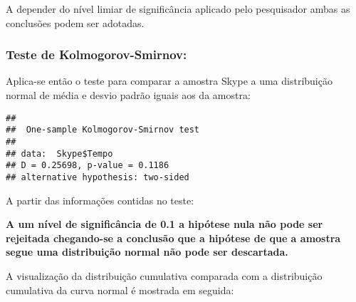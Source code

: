 \documentclass[
]{article}
\newenvironment{Shaded}{\begin{snugshade}}{\end{snugshade}}
\newcommand{\DataTypeTok}[1]{\textcolor[rgb]{0.13,0.29,0.53}{#1}}
\newcommand{\DecValTok}[1]{\textcolor[rgb]{0.00,0.00,0.81}{#1}}
\newcommand{\KeywordTok}[1]{\textcolor[rgb]{0.13,0.29,0.53}{\textbf{#1}}}
\newcommand{\NormalTok}[1]{#1}
\newcommand{\OperatorTok}[1]{\textcolor[rgb]{0.81,0.36,0.00}{\textbf{#1}}}
\newcommand{\StringTok}[1]{\textcolor[rgb]{0.31,0.60,0.02}{#1}}
\begin{document}
A depender do nível limiar de significância aplicado pelo pesquisador
ambas as conclusões podem ser adotadas.

\hypertarget{teste-de-kolmogorov-smirnov-2}{%
\subsubsection{Teste de
Kolmogorov-Smirnov:}\label{teste-de-kolmogorov-smirnov-2}}

Aplica-se então o teste para comparar a amostra Skype a uma distribuição
normal de média e desvio padrão iguais aos da amostra:

\begin{Shaded}
\end{Shaded}

\begin{verbatim}
## 
##  One-sample Kolmogorov-Smirnov test
## 
## data:  Skype$Tempo
## D = 0.25698, p-value = 0.1186
## alternative hypothesis: two-sided
\end{verbatim}

A partir das informações contidas no teste:

\textbf{A um nível de significância de 0.1 a hipótese nula não pode ser
rejeitada chegando-se a conclusão que a hipótese de que a amostra segue
uma distribuição normal não pode ser descartada.}

A visualização da distribuição cumulativa comparada com a distribuição
cumulativa da curva normal é mostrada em seguida:

\begin{Shaded}
\end{Shaded}
\end{document}
